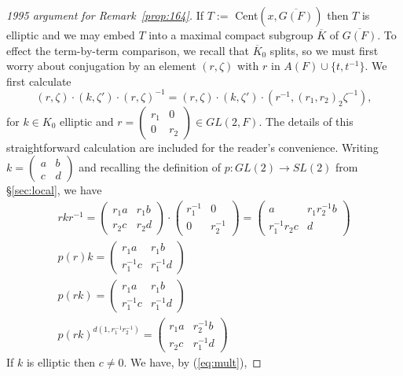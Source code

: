 \documentclass[12pt,letterpaper,openany]{book}
\theoremstyle{plain}
\theoremstyle{definition}
\theoremstyle{remark}
\theoremstyle{remark}
\begin{document}
\begin{proof}[1995 argument for Remark~\ref{prop:164}]
If $T:=$ Cent$(x,\overline{G(F)})$ then $T$ is elliptic and we may embed $T$ into a maximal
compact subgroup $\overline{K}$ of $\overline{G(F)}$.
To effect the term-by-term comparison, we recall that $\overline{K}_0$
splits, so we must first worry about conjugation by
an element $(r,\zeta)$ with $r$ in $A(F)\cup \{t,t^{-1}\}$.
We first calculate
$$
(r,\zeta)\cdot (k,\zeta')\cdot ( r,\zeta)^{-1}
=(r,\zeta)\cdot (k,\zeta')\cdot (r^{-1},(r_1,r_2)_2\zeta^{-1} ),
$$
for $k\in K_0$ elliptic
and $r=\left(\begin{array}{cc} r_1&0\\0&r_2\end{array}\right)\in
GL(2,F)$. The details of this straightforward calculation are
included for the
reader's convenience. Writing
$k=\left(\begin{array}{cc} a&b\\c&d\end{array}\right)$ and
recalling the definition of $p:GL(2)\rightarrow SL(2)$ from \S\ref{sec:local}, we have
\begin{equation}
\begin{array}{c}
rkr^{-1}=\left(\begin{array}{cc} r_1a&r_1b\\r_2c&r_2d\end{array}\right)\cdot
\left(\begin{array}{cc} r_1^{-1}&0\\0&r_2^{-1}\end{array}\right)
=\left(\begin{array}{cc} a&r_1r_2^{-1}b\\r_1^{-1}r_2c&d\end{array}\right)\\
p(r)k=
\left(\begin{array}{cc} r_1a&r_1b\\r_1^{-1}c&r_1^{-1}d\end{array}\right)\\
p(rk)=
\left(\begin{array}{cc} r_1a&r_1b\\r_1^{-1}c&r_1^{-1}d\end{array}\right)\\
p(rk)^{d(1,r_1^{-1}r_2^{-1})}=
\left(\begin{array}{cc} r_1a&r_2^{-1}b\\r_2c&r_1^{-1}d\end{array}\right)
\end{array}
\end{equation}
If $k$ is elliptic then $c\not= 0$. We have, by (\ref{eq:mult}), 

\end{proof}
\end{document}
